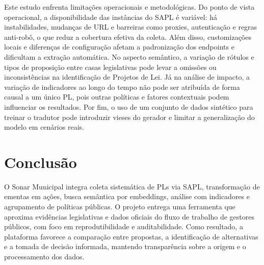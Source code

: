 \documentclass[10pt,a4paper]{article}
\begin{document}
Este estudo enfrenta limitações operacionais e metodológicas. Do ponto de vista operacional, a disponibilidade das instâncias do SAPL é variável: há instabilidades, mudanças de URL e barreiras como proxies, autenticação e regras anti-robô, o que reduz a cobertura efetiva da coleta. Além disso, customizações locais e diferenças de configuração afetam a padronização dos endpoints e dificultam a extração automática. No aspecto semântico, a variação de rótulos e tipos de proposição entre casas legislativas pode levar a omissões ou inconsistências na identificação de Projetos de Lei. Já na análise de impacto, a variação de indicadores ao longo do tempo não pode ser atribuída de forma causal a um único PL, pois outras políticas e fatores contextuais podem influenciar os resultados. Por fim, o uso de um conjunto de dados sintético para treinar o tradutor pode introduzir vieses do gerador e limitar a generalização do modelo em cenários reais.

\section{Conclusão}

O Sonar Municipal integra coleta sistemática de PLs via SAPL, transformação de ementas em ações, busca semântica por embeddings, análise com indicadores e agrupamento de políticas públicas. O projeto entrega uma ferramenta que aproxima evidências legislativas e dados oficiais do fluxo de trabalho de gestores públicos, com foco em reprodutibilidade e auditabilidade. Como resultado, a plataforma favorece a comparação entre propostas, a identificação de alternativas e a tomada de decisão informada, mantendo transparência sobre a origem e o processamento dos dados.

\printbibliography
\end{document}
